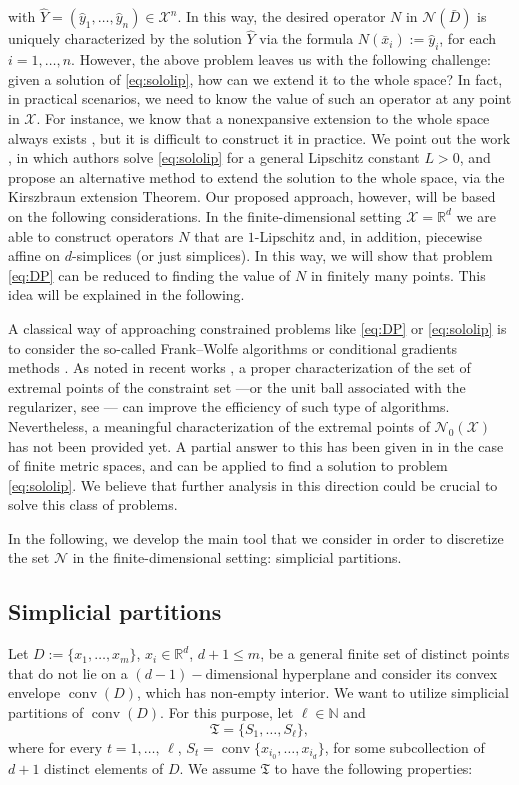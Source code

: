 \documentclass[onefignum,onetabnum]{siamonline250211}
\newcommand{\N}{\mathcal{N}}
\newcommand{\R}{\mathbb{R}}
\newcommand{\conv}{\operatorname{conv}}
\newcommand{\cX}{\mathcal{X}}
\begin{document}
with $\widehat Y= (\hat y_1, \ldots,\hat y_n)\in \mathcal{X}^n$. In this way, the desired operator $N$ in $\mathcal{N}(\bar D)$ is uniquely characterized by the solution $\widehat Y$ via the formula $N(\bar x_i):= \hat y_i$, for each $i=1, \ldots, n$. However, the above problem leaves us with the following challenge: given a solution of \cref{eq:sololip}, how can we extend it to the whole space? In fact, in practical scenarios, we need to know the value of such an operator at any point in $\cX$. For instance, we know that a nonexpansive extension to the whole space always exists \cite{kirz}, but it is difficult to construct it in practice. We point out the work \cite{Zaichyk2023}, in which authors solve \cref{eq:sololip} for a general Lipschitz constant $L>0$, and propose an alternative method to extend the solution to the whole space, via the Kirszbraun extension Theorem. Our proposed approach, however, will be based on the following considerations. In the finite-dimensional setting $\cX=\R^d$ we are able to construct operators $N$ that are $1$-Lipschitz and, in addition, piecewise affine on $d$-simplices (or just simplices). In this way, we will show that problem \cref{eq:DP} can be reduced to finding the value of $N$ in finitely many points. This idea will be explained in the following.

\begin{remark}
A classical way of approaching constrained problems like \cref{eq:DP} or \cref{eq:sololip} is to consider the so-called Frank--Wolfe algorithms or conditional gradients methods \cite{fwa,jaggi2013}. As noted in recent works \cite{breetal22,brelinear,crisiglewal}, a proper characterization of the set of extremal points of the constraint set ---or the unit ball associated with the regularizer, see \cite{duval}--- can improve the efficiency of such type of algorithms. Nevertheless, a meaningful characterization of the extremal points of $\N_0(\cX)$ has not been provided yet. A partial answer to this has been given in \cite{bredies2023extreme} in the case of finite metric spaces, and can be applied to find a solution to problem \cref{eq:sololip}. We believe that further analysis in this direction could be crucial to solve this class of problems.
\end{remark}

In the following, we develop the main tool that we consider in order to discretize the set $\N$ in the finite-dimensional setting: simplicial partitions.

\subsection{Simplicial partitions}
\label{triangs}
Let $D:=\{x_1,\ldots, x_m\}$, $x_i\in\R^d$, $d+1\leq m$, be a general finite set of distinct points that do not lie on a $(d-1)-$dimensional hyperplane and consider its convex envelope $\conv(D)$, which has non-empty interior. We want to utilize simplicial partitions of $\conv(D)$. For this purpose, let $\ell\in\mathbb{N}$ and
$$
\mathfrak{T}=\{S_1,\ldots, S_\ell\},
$$
where for every $t=1,\ldots, \, \ell$, $S_t=\conv\{x_{i_0},\dots,x_{i_d}\}$, for some subcollection of $d+1$ distinct elements of $D$. We assume $\mathfrak{T}$ to have the following properties:
\end{document}

